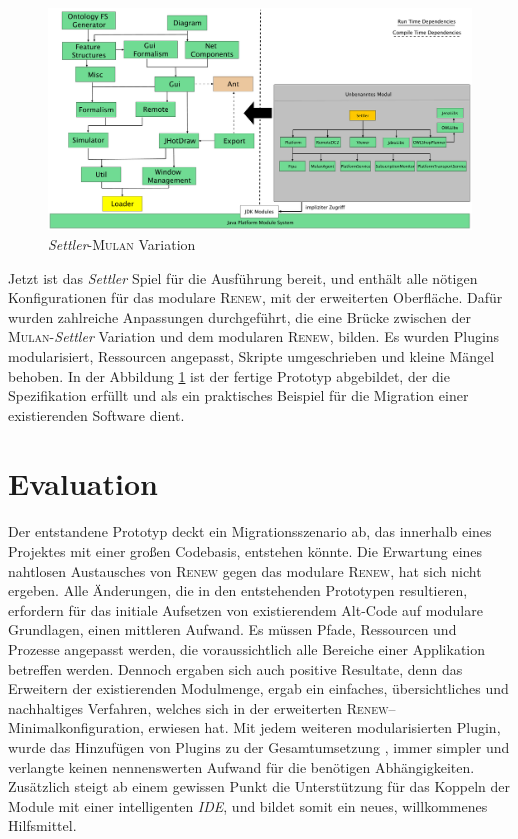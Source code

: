 	\begin{figure}[h!]
	  \centering
	  \includegraphics[width=\textwidth]{material/images/settler-renew-mulan-vm.pdf}
	  \caption{\textit{Settler}-\textsc{Mulan} Variation}
	  \label{fig:mul_prot}
	\end{figure}

	Jetzt ist das \textit{Settler} Spiel für die Ausführung bereit, und enthält alle nötigen Konfigurationen für das modulare \textsc{Renew}, mit der erweiterten Oberfläche. Dafür wurden zahlreiche Anpassungen durchgeführt, die eine Brücke zwischen der \textsc{Mulan}-\textit{Settler} Variation und dem modularen \textsc{Renew}, bilden. Es wurden Plugins modularisiert, Ressourcen angepasst, Skripte umgeschrieben und kleine Mängel behoben. \newline
	In der Abbildung \ref{fig:mul_prot} ist der fertige Prototyp abgebildet, der die Spezifikation erfüllt und als ein praktisches Beispiel für die Migration einer existierenden Software dient. 

\section{Evaluation}
	Der entstandene Prototyp deckt ein Migrationsszenario ab, das innerhalb eines Projektes mit einer großen Codebasis, entstehen könnte. Die Erwartung eines nahtlosen Austausches von \textsc{Renew} gegen das modulare \textsc{Renew}, hat sich nicht ergeben. Alle Änderungen, die in den entstehenden Prototypen resultieren, erfordern für das initiale Aufsetzen von existierendem Alt-Code auf modulare Grundlagen, einen mittleren Aufwand. Es müssen Pfade, Ressourcen und Prozesse angepasst werden, die voraussichtlich alle Bereiche einer Applikation betreffen werden.\newline
	Dennoch ergaben sich auch positive Resultate, denn das Erweitern der existierenden Modulmenge, ergab ein einfaches, übersichtliches und nachhaltiges Verfahren, welches sich in der erweiterten \textsc{Renew}--Minimalkonfiguration, erwiesen hat. Mit jedem weiteren modularisierten Plugin, wurde das Hinzufügen von Plugins zu der Gesamtumsetzung , immer simpler und verlangte keinen nennenswerten Aufwand für die benötigen Abhängigkeiten. Zusätzlich steigt ab einem gewissen Punkt die Unterstützung für das Koppeln der Module mit einer intelligenten \textit{IDE}, und bildet somit ein neues, willkommenes Hilfsmittel.
